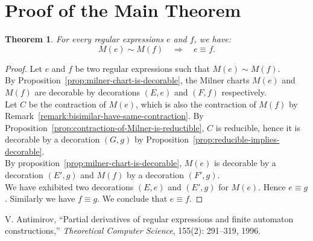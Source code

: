 \documentclass{article}
\newtheorem{theorem}[definition]{Theorem}
\begin{document}
\section{Proof of the Main Theorem}
\begin{theorem} For every regular expressions $e$ and $f$, we have:
     $$M(e)\sim M(f) \quad \Longrightarrow \quad e \equiv f.$$
\end{theorem}
\begin{proof}
    Let $e$ and $f$ be two regular expressions such that $M(e)\sim M(f)$. \\
    
    By Proposition~\ref{prop:milner-chart-is-decorable}, the Milner charts $M(e)$ and $M(f)$ are decorable by decorations
     $(E,e)$ and $(F,f)$ respectively.\\

    Let $C$ be the contraction of $M(e)$, which is also the contraction of $M(f)$ by Remark~\ref{remark:bisimilar-have-same-contraction}.
    By Proposition~\ref{prop:contraction-of-Milner-is-reductible}, $C$ is reducible, 
    hence it is decorable by a decoration $(G,g)$ by Proposition~\ref{prop:reducible-implies-decorable}.\\


    By proposition~\ref{prop:milner-chart-is-decorable}, $M(e)$ is decorable by a decoration $(E',g)$ and $M(f)$ by a decoration $(F',g)$.\\

    We have exhibited two decorations $(E,e)$ and $(E',g)$ for  $M(e)$. Hence $e\equiv g$. Similarly we have 
    $f\equiv g$. We conclude that $e\equiv f$.
\end{proof}
    \begin{thebibliography}{9}
V. Antimirov, ``Partial derivatives of regular expressions and finite automaton constructions,'' \emph{Theoretical Computer Science}, 155(2): 291--319, 1996.
\end{thebibliography}
\end{document}
